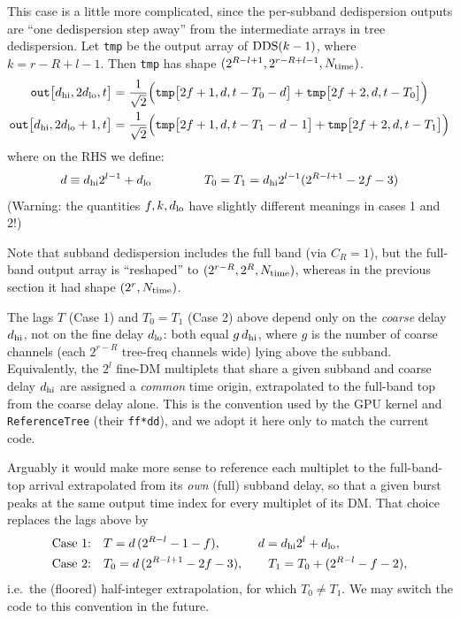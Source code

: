 \documentclass{article}
\numberwithin{equation}{section}   %
\def\DDS{{\rm DDS}}
\def\nn{\nonumber}
\begin{document}
\begin{itemize}
This case is a little more complicated, since the per-subband dedispersion outputs are ``one dedispersion step away''
from the intermediate arrays in tree dedispersion.
Let \verb|tmp| be the output array of $\DDS(k-1)$, where $k=r-R+l-1$. 
Then \verb|tmp| has shape $(2^{R-l+1}, 2^{r-R+l-1}, N_{\rm time})$.
\begin{align}
{\tt out}\big[ d_{\rm hi}, 2 d_{\rm lo}, t \big] 
  &= \frac{1}{\sqrt{2}} \Big( {\tt tmp}\big[ 2f+1, d, t - T_0 - d \big] + {\tt tmp}\big[ 2f+2, d, t - T_0 \big] \Big) \nn \\
{\tt out}\big[ d_{\rm hi}, 2 d_{\rm lo} + 1, t \big] 
  &= \frac{1}{\sqrt{2}} \Big( {\tt tmp}\big[ 2f+1, d, t - T_1 - d - 1 \big] + {\tt tmp}\big[ 2f+2, d, t - T_1 \big] \Big) 
\end{align}
where on the RHS we define:
\begin{equation}
d \equiv d_{\rm hi} 2^{l-1} + d_{\rm lo}
  \hspace{1.5cm} T_0 = T_1 = d_{\rm hi} 2^{l-1} (2^{R-l+1} - 2f - 3)
\end{equation}
(Warning: the quantities $f,k,d_{\rm lo}$ have slightly different meanings in cases 1 and 2!)

\end{itemize}
Note that subband dedispersion includes the full band (via $C_R=1$), but the full-band output array is
``reshaped'' to $(2^{r-R}, 2^R, N_{\rm time})$, whereas in the previous section it had shape $(2^r, N_{\rm time})$.

\medskip
{}
The lags $T$ (Case 1) and $T_0 = T_1$ (Case 2) above depend only on the {\em coarse} delay $d_{\rm hi}$,
not on the fine delay $d_{\rm lo}$: both equal $g\, d_{\rm hi}$, where $g$ is the number of coarse
channels (each $2^{r-R}$ tree-freq channels wide) lying above the subband.
Equivalently, the $2^l$ fine-DM multiplets that share a given subband and coarse delay $d_{\rm hi}$ are
assigned a {\em common} time origin, extrapolated to the full-band top from the coarse delay alone.
This is the convention used by the GPU kernel and \verb|ReferenceTree| (their \verb|ff*dd|), and we
adopt it here only to match the current code.

Arguably it would make more sense to reference each multiplet to the full-band-top arrival
extrapolated from its {\em own} (full) subband delay, so that a given burst peaks at the same output
time index for every multiplet of its DM. That choice replaces the lags above by
\begin{align}
\mbox{Case 1:}\quad & T = d\,(2^{R-l}-1-f), \qquad\quad d = d_{\rm hi}2^l + d_{\rm lo}, \nn \\
\mbox{Case 2:}\quad & T_0 = d\,(2^{R-l+1}-2f-3), \qquad T_1 = T_0 + (2^{R-l}-f-2),
\end{align}
i.e.~the (floored) half-integer extrapolation, for which $T_0 \ne T_1$. We may switch the code to
this convention in the future.
\end{document}
